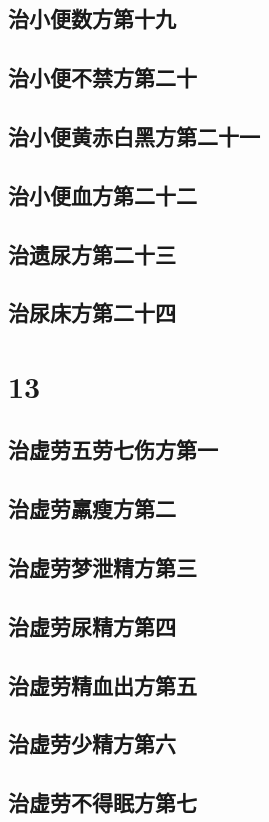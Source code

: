 \documentclass[a4paper,12pt,UTF8,twoside]{ctexbook}
\begin{document}
\chapter{治小便数方第十九}
\chapter{治小便不禁方第二十}
\chapter{治小便黄赤白黑方第二十一}
\chapter{治小便血方第二十二}
\chapter{治遗尿方第二十三}
\chapter{治尿床方第二十四}

\part{13}
\chapter{治虚劳五劳七伤方第一}
\chapter{治虚劳羸瘦方第二}
\chapter{治虚劳梦泄精方第三}
\chapter{治虚劳尿精方第四}
\chapter{治虚劳精血出方第五}
\chapter{治虚劳少精方第六}
\chapter{治虚劳不得眠方第七}
\end{document}
